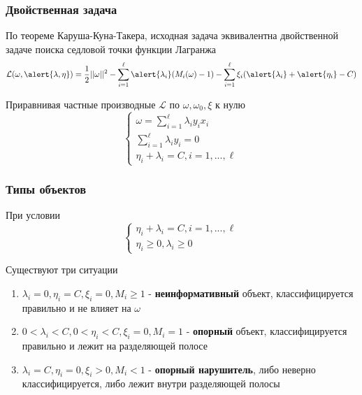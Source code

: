 \documentclass{beamer}
\begin{document}
	\begin{frame}
		\frametitle{Двойственная задача}
		По теореме Каруша-Куна-Такера, исходная задача эквивалентна двойственной задаче поиска седловой точки функции Лагранжа
		\[
		\mathcal{L}(\omega, \alert{\lambda, \eta}) = 
		\frac{1}{2} ||\omega||^2 
		- \sum_{i=1}^{\ell} \alert{\lambda_i} (M_i(\omega) - 1)
		- \sum_{i=1}^{\ell} \xi_i (\alert{\lambda_i} + \alert{\eta_i} - C)
		\]
		
		Приравнивая частные производные $\mathcal{L}$ по $\omega, \omega_0, \xi$ к нулю
		\[
		\begin{cases}
			\omega = \sum_{i=1}^{\ell} \lambda_i y_i x_i \\
			\sum_{i=1}^{\ell} \lambda_i y_i = 0 \\
			\eta_i + \lambda_i = C, i=1, ..., \ell
		\end{cases}
		\]
	\end{frame}
	
	\begin{frame}
		\frametitle{Типы объектов}
		 При условии
		 \[
		 \begin{cases}
		 	\eta_i + \lambda_i = C, i=1, ..., \ell \\
		 	\eta_i \ge 0, \lambda_i \ge 0
		 \end{cases}
		 \]
		 
		 Существуют три ситуации
		 \begin{enumerate}
		 	\item $\lambda_i = 0, \eta_i = C, \xi_i = 0, M_i \ge 1$
		 	- \textbf{неинформативный}  объект, классифицируется правильно и не влияет на $\omega$
		 	
		 	\item $0 < \lambda_i < C, 0 < \eta_i < C, \xi_i = 0, M_i = 1$
		 	- \textbf{опорный} объект, классифицируется правильно и лежит на разделяющей полосе
		 	
		 	\item $\lambda_i = C, \eta_i = 0, \xi_i > 0, M_i < 1$
		 	- \textbf{опорный нарушитель}, либо неверно классифицируется, либо лежит внутри разделяющей полосы
		 \end{enumerate}
	\end{frame}
	
\end{document}
